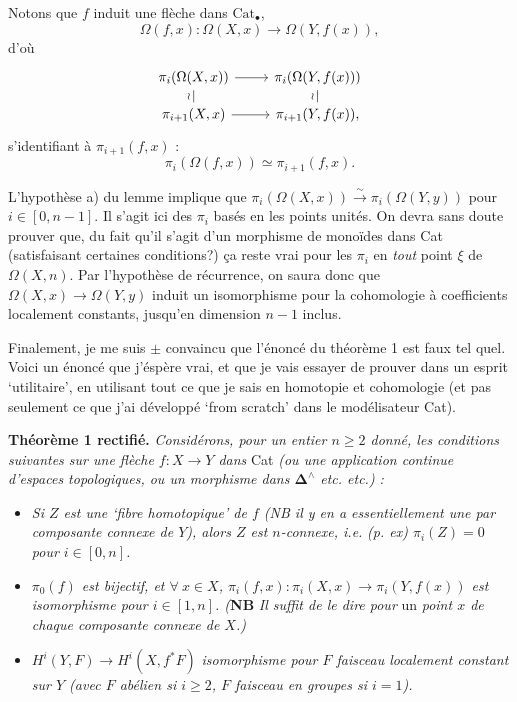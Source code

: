 \documentclass[11pt]{article}
\newcommand{\printedpage}[1]{{\reversemarginpar\marginnote{\raggedleft\scriptsize ed.~#1}}}
\newcommand{\msp}[1]{\marginpar{\raggedright\scriptsize ms.~#1}}
\begin{document}
Notons que $f$ induit une flèche dans $\mathrm{Cat}_\bullet$,
\[
\Omega(f,x) : \Omega(X,x) \longrightarrow \Omega(Y,f(x)),
\]
d'où
\[
\begin{tikzcd}[row sep=small]
\pi_i(\Omega(X,x)) \arrow[r] \arrow[d, dash, "\wr"'] & \pi_i(\Omega(Y,f(x))) \arrow[d, dash, "\wr"'] \\
\pi_{i+1}(X,x) \arrow[r] & \pi_{i+1}(Y,f(x)),
\end{tikzcd}
\]
s'identifiant à $\pi_{i+1}(f,x)$ :
\[
\pi_i(\Omega(f,x)) \simeq \pi_{i+1}(f,x).
\]


\printedpage{119}

L'hypothèse a) du lemme implique que $\pi_i(\Omega(X,x)) \xrightarrow{\sim} \pi_i(\Omega(Y,y))$ pour $i \in [0,n-1]$. Il s'agit ici des $\pi_i$ basés en les points unités. On devra sans doute prouver que, du fait qu'il s'agit d'un morphisme de monoïdes dans Cat (satisfaisant certaines conditions?) ça reste vrai pour les $\pi_i$ en \textit{tout} point $\xi$ de $\Omega(X,n)$. Par l'hypothèse de récurrence, on saura donc que $\Omega(X,x) \longrightarrow \Omega(Y,y)$ %
\msp{page 178}
induit un isomorphisme pour la cohomologie à coefficients localement constants, jusqu'en dimension $n-1$ inclus.

Finalement, je me suis $\pm$ convaincu que l'énoncé du théorème 1 est faux tel quel. Voici un énoncé que j'éspère vrai, et que je vais essayer de prouver dans un esprit `utilitaire', en utilisant tout ce que je sais en homotopie et cohomologie (et pas seulement ce que j'ai développé `from scratch' dans le modélisateur Cat). %

\textbf{Théorème 1 rectifié.} \textit{Considérons, pour un entier $n \geq 2$ donné, les conditions suivantes sur une flèche $f : X \longrightarrow Y$ dans} Cat \textit{(ou une application continue d'espaces topologiques, ou un morphisme dans $\mathbf{\Delta}^\wedge$ etc. etc.) :}

\begin{itemize}
\item[$a_n$)] \textit{Si $Z$ est une `fibre homotopique' de $f$ (NB il y en a essentiellement une par composante connexe de $Y$), alors $Z$ est $n$-connexe, i.e.}
\msp{page 179}
\textit{(p. ex) $\pi_i(Z) = 0$ pour $i \in [0,n]$.}

\item[$b_n$)] \textit{$\pi_0(f)$ est bijectif, et $\forall\ x \in X$, $\pi_i(f,x) : \pi_i(X,x) \longrightarrow \pi_i(Y,f(x))$ est} \textit{isomorphisme pour $i \in [1,n]$. (}\textbf{NB} \textit{Il suffit de le dire pour} \textup{un} \textit{point $x$ de chaque composante connexe de $X$.)}

\item[$c_n$)] $H^i(Y,F) \longrightarrow H^i(X,f^*F)$ \textit{isomorphisme pour $F$ faisceau localement constant sur $Y$ (avec $F$ abélien si $i \geq 2$, $F$ faisceau en groupes si $i = 1$).}
\end{itemize}
\end{document}
